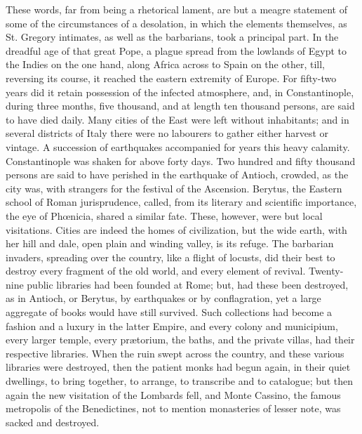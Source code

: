 These words, far from being a rhetorical lament, are but a meagre
statement of some of the circumstances of a desolation, in which the
elements themselves, as St. Gregory intimates, as well as the
barbarians, took a principal part. In the dreadful age of that great
Pope, a plague spread from the lowlands of Egypt to the Indies on the
one hand, along Africa across to Spain on the other, till, reversing
its course, it reached the eastern extremity of Europe. For fifty-two
years did it retain possession of the infected atmosphere, and, in
Constantinople, during three months, five thousand, and at length ten
thousand persons, are said to have died daily. Many cities of the East
were left without inhabitants; and in several districts of Italy there
were no labourers to gather either harvest or vintage. A succession of
earthquakes accompanied for years this heavy calamity. Constantinople
was shaken for above forty days. Two hundred and fifty thousand
persons are said to have perished in the earthquake of Antioch,
crowded, as the city was, with strangers for the festival of the
Ascension. Berytus, the Eastern school of Roman jurisprudence, called,
from its literary and scientific importance, the eye of Phœnicia,
shared a similar fate. These, however, were but local visitations.
Cities are indeed the homes of civilization, but the wide earth, with
her hill and dale, open plain and winding valley, is its refuge. The
barbarian invaders, spreading over the country, like a flight of
locusts, did their best to destroy every fragment of the old world,
and every element of revival. Twenty-nine public libraries had been
founded at Rome; but, had these been destroyed, as in Antioch, or
Berytus, by earthquakes or by conflagration, yet a large aggregate of
books would have still survived. Such collections had become a fashion
and a luxury in the latter Empire, and every colony and municipium,
every larger temple, every prætorium, the baths, and the private
villas, had their respective libraries. When the ruin swept across the
country, and these various libraries were destroyed, then the patient
monks had begun again, in their quiet dwellings, to bring together, to
arrange, to transcribe and to catalogue; but then again the new
visitation of the Lombards fell, and Monte Cassino, the famous
metropolis of the Benedictines, not to mention monasteries of lesser
note, was sacked and destroyed.

